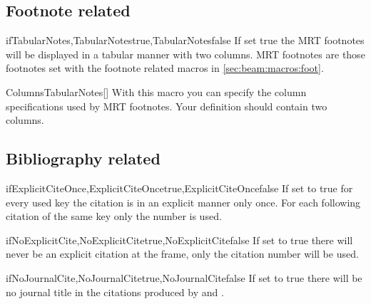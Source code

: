 \subsection{Footnote related}
\begin{describemacro}{ifTabularNotes,TabularNotestrue,TabularNotesfalse}
  If set true the MRT footnotes will be displayed in a tabular manner with two
  columns. MRT footnotes are those footnotes set with the footnote related
  macros in \autoref{sec:beam:macros:foot}.
\end{describemacro}

\begin{describemacro}{ColumnsTabularNotes}[]
  With this macro you can specify the column specifications used by MRT
  footnotes. Your definition should contain two columns.
\end{describemacro}

\subsection{Bibliography related}
\begin{describemacro}
  {ifExplicitCiteOnce,ExplicitCiteOncetrue,ExplicitCiteOncefalse}%
  If set to true for every used key the citation is in an explicit manner only
  once. For each following citation of the same key only the number is used.
\end{describemacro}

\begin{describemacro}{ifNoExplicitCite,NoExplicitCitetrue,NoExplicitCitefalse}
  If set to true there will never be an explicit citation at the frame, only the
  citation number will be used.
\end{describemacro}

\begin{describemacro}{ifNoJournalCite,NoJournalCitetrue,NoJournalCitefalse}
  If set to true there will be no journal title in the citations produced by
   and .
\end{describemacro}

